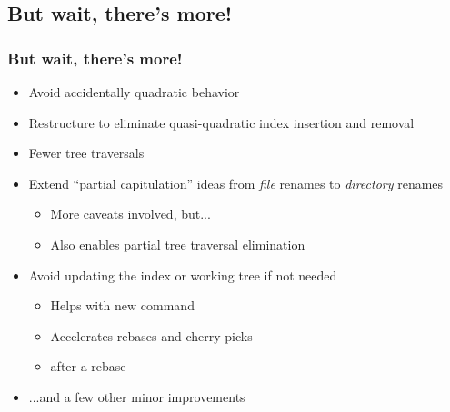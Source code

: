 \documentclass[compress,t]{beamer}
\begin{document}
\subsection[Honing]{But wait, there's more!}
\begin{frame}
  \frametitle{But wait, there's more!}

  \begin{itemize}

    \item Avoid accidentally quadratic behavior

    \item Restructure to eliminate quasi-quadratic index insertion and
          removal

    \item Fewer tree traversals

    \item Extend ``partial capitulation'' ideas from \textit{file}
          renames to \textit{directory} renames

      \begin{itemize}
        \item More caveats involved, but...
        \item Also enables partial tree traversal elimination
      \end{itemize}

    \item Avoid updating the index or working tree if not needed

      \begin{itemize}
        \item Helps with new  command
        \item Accelerates rebases and cherry-picks
        \item {}%
               after a rebase
      \end{itemize}

    \item ...and a few other minor improvements

  \end{itemize}

\end{frame}
\end{document}
